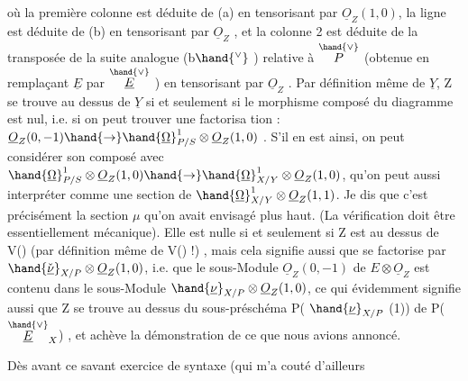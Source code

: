 où la première colonne est déduite de (a) en tensorisant par $\underline{O}_Z(1,0)$,
la ligne est déduite de  (b) en tensorisant par $\underline{O}_Z$  , et la colonne 2
est déduite  de la transposée de la suite analogue  (b$\hand{^\vee}$ ) relative à $\overset{\hand{\vee}}{P}$  (obtenue
en remplaçant $\underline{E}$ par $\overset{\hand{\vee}}{\underline{E}}$ )  en tensorisant par $\underline{O}_Z$ . Par définition même
de $\underline{Y}$, Z se trouve au dessus de $\underline{Y}$  si et seulement si le morphisme
composé \hand{$\alpha$} du diagramme est nul, i.e.  si on peut trouver une  factorisa
tion \hand{$\beta$}: $\underline{O}_Z(0,-1) \hand{\rightarrow} \hand{\underline{\Omega}}^1_{P/S}\otimes \underline{O}_Z(1,0)$ .  S'il en est ainsi, on  peut
considérer  son composé avec  $\hand{\underline{\Omega}}^1_{P/S} \otimes \underline{O}_Z(1,0) \hand{\rightarrow} \hand{\underline{\Omega}}^1_{X/Y} \otimes \underline{O}_Z(1,0)$,
qu'on peut aussi interpréter comme une section de $\hand{\underline{\Omega}}^1_{X/Y}\otimes \underline{O}_Z(1,1)$.
Je dis que c'est précisément la section $\mu$ qu'on avait envisagé plus haut.
(La vérification doit être essentiellement mécanique).  Elle est
nulle  si et seulement si  Z est au dessus de V(\hand{$\mu$})  (par définition
même de V(\hand{$\mu$}) !) , mais cela signifie aussi  que \hand{$\beta$} se factorise par
$\hand{\check{\underline{\nu}}}_{X/P} \otimes \underline{O}_Z(1,0)$, i.e. que  le sous-Module $\underline{O}_Z(0,-1)$ de $E\otimes \underline{O}_Z$ est contenu
dans le sous-Module $\hand{\underline{\nu}}_{X/P} \otimes \underline{O}_Z(1,0)$,  ce qui évidemment signifie aussi
que  Z se trouve au dessus du sous-préschéma  P( $\hand{\underline{\nu}}_{X/P}$ (1)) de P($\overset{\hand{\vee}}{\underline{E}}_X$) , et
achève la démonstration de ce que nous avions annoncé.

Dès avant ce savant exercice de syntaxe (qui m'a couté d'ailleurs

